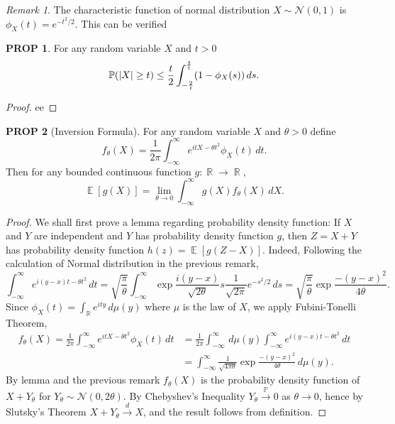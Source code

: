 \documentclass[hidelinks,11pt]{article}
\theoremstyle{definition}
\theoremstyle{dotles}
\theoremstyle{dotless}
\newtheorem{prop}{PROP}[section]
\theoremstyle{remark}
\newtheorem*{remark}{Remark}
\DeclareMathOperator{\E}{\mathbb{E}}
\DeclareMathOperator{\R}{\mathbb{R}}
\begin{document}
\begin{remark}
The characteristic function of normal distribution $X\sim\mathcal{N}(0,1)$ is $\phi_X(t)=e^{-t^2/2}$. This can be verified
\end{remark}

\begin{prop}
For any random variable $X$ and $t>0$
\[\mathbb{P}(\abs{X}\geq t)\leq\frac{t}{2}\int_{-\frac{2}{t}}^{\frac{2}{t}}(1-\phi_X(s))\,ds.\]
\end{prop}

\begin{proof}
ee
\end{proof}

\begin{prop}[Inversion Formula]
For any random variable $X$ and $\theta>0$ define
\[f_\theta(X)=\frac{1}{2\pi}\int_{-\infty}^\infty e^{itX-\theta t^2}\phi_X(t)\,dt.\]
Then for any bounded continuous function $g:\R\to\R$,
\[\E[g(X)]=\lim_{\theta\to0}\int_{-\infty}^\infty g(X)f_\theta(X)\,dX.\]
\end{prop}
\begin{proof}
We shall first prove a lemma regarding probability density function: If $X$ and $Y$ are independent and $Y$ has probability density function $g$, then $Z=X+Y$ has probability density function $h(z)=\E[g(Z-X)]$.\smallbreak
Indeed,\smallbreak
Following the calculation of Normal distribution in the previous remark,
\[\int_{-\infty}^\infty e^{i(y-x)t-\theta t^2}\,dt=\sqrt{\frac{\pi}{\theta}}\int_{-\infty}^\infty\exp{\frac{i(y-x)}{\sqrt{2\theta}}s}\frac{1}{\sqrt{2\pi}}e^{-s^2/2}\,ds=\sqrt{\frac{\pi}{\theta}}\exp{\frac{-(y-x)^2}{4\theta}}.\]
Since $\phi_X(t)=\int_\mathbb{R}e^{ity}\,d\mu(y)$ where $\mu$ is the law of $X$, we apply Fubini-Tonelli Theorem,
\begin{align*}
f_\theta(X)=\frac{1}{2\pi}\int_{-\infty}^\infty e^{itX-\theta t^2}\phi_X(t)\,dt&=\frac{1}{2\pi}\int_{-\infty}^\infty\,d\mu(y)\int_{-\infty}^\infty e^{i(y-x)t-\theta t^2}\,dt\\&=\int_{-\infty}^\infty\frac{1}{\sqrt{4\pi\theta}}\exp{\frac{-(y-x)^2}{4\theta}}\,d\mu(y).
\end{align*}
By lemma and the previous remark $f_\theta(X)$ is the probability density function of $X+Y_\theta$ for $Y_\theta\sim \mathcal{N}(0,2\theta)$. By Chebyshev's Inequality $Y_\theta\xrightarrow{\mathbb{P}}0$ as $\theta\to0$, hence by Slutsky's Theorem $X+Y_\theta\xrightarrow{d}X$, and the result follows from definition.
\end{proof}
\end{document}
